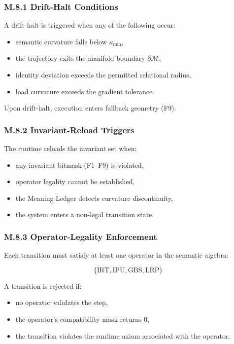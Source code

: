 \subsubsection*{M.8.1 Drift-Halt Conditions}

A drift-halt is triggered when any of the following occur:

\begin{itemize}
    \item semantic curvature falls below $\kappa_{\min}$,
    \item the trajectory exits the manifold boundary $\partial \mathcal{M}$,
    \item identity deviation exceeds the permitted relational radius,
    \item load curvature exceeds the gradient tolerance.
\end{itemize}

Upon drift-halt, execution enters fallback geometry (F9).

\subsubsection*{M.8.2 Invariant-Reload Triggers}

The runtime reloads the invariant set when:

\begin{itemize}
    \item any invariant bitmask (F1–F9) is violated,
    \item operator legality cannot be established,
    \item the Meaning Ledger detects curvature discontinuity,
    \item the system enters a non-legal transition state.
\end{itemize}

\subsubsection*{M.8.3 Operator-Legality Enforcement}

Each transition must satisfy at least one operator in the semantic algebra:



\[
\{\text{IRT}, \text{IPU}, \text{GBS}, \text{LRP}\}
\]



A transition is rejected if:

\begin{itemize}
    \item no operator validates the step,
    \item the operator’s compatibility mask returns 0,
    \item the transition violates the runtime axiom associated with the operator.
\end{itemize}

